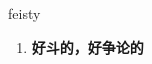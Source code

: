 
\begin{frame}
{\huge feisty}
\begin{center}
\begin{enumerate}\Large
  \item \textbf{好斗的，好争论的}
\end{enumerate}
\end{center}
\end{frame}
